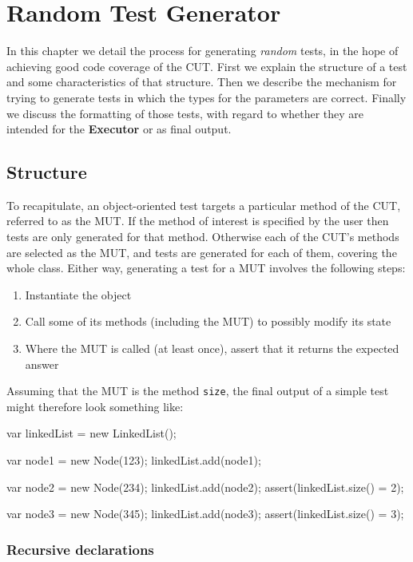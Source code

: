 \chapter{Random Test Generator}

In this chapter we detail the process for generating \emph{random} tests, in the hope of achieving good code coverage of the CUT. First we explain the structure of a test and some characteristics of that structure. Then we describe the mechanism for trying to generate tests in which the types for the parameters are correct. Finally we discuss the formatting of those tests, with regard to whether they are intended for the \textbf{Executor} or as final output.

\section{Structure}

To recapitulate, an object-oriented test targets a particular method of the CUT, referred to as the MUT. If the method of interest is specified by the user then tests are only generated for that method. Otherwise each of the CUT's methods are selected as the MUT, and tests are generated for each of them, covering the whole class. Either way, generating a test for a MUT involves the following steps:

\begin{enumerate}
	\item Instantiate the object
	\item Call some of its methods (including the MUT) to possibly modify its state
	\item Where the MUT is called (at least once), assert that it returns the expected answer
\end{enumerate}

Assuming that the MUT is the method \texttt{size}, the final output of a simple test might therefore look something like:

\begin{verbcode}
var linkedList = new LinkedList();

var node1 = new Node(123);
linkedList.add(node1);

var node2 = new Node(234);
linkedList.add(node2);
assert(linkedList.size() = 2);

var node3 = new Node(345);
linkedList.add(node3);
assert(linkedList.size() = 3);
\end{verbcode}

\subsection{Recursive declarations}

